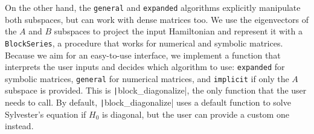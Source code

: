 On the other hand, the \texttt{general} and \texttt{expanded} algorithms explicitly
manipulate both subspaces, but can work with dense matrices too.
We use the eigenvectors of the $A$ and $B$ subspaces to project the input
Hamiltonian and represent it with a \texttt{BlockSeries}, a procedure that works for
numerical and symbolic matrices.
Because we aim for an easy-to-use interface, we implement a function that
interprets the user inputs and decides which algorithm to use: \texttt{expanded}
for symbolic matrices, \texttt{general} for numerical matrices, and \texttt{implicit} if
only the $A$ subspace is provided.
This is \texttt|block\_diagonalize|, the only function that the user needs to call.
By default, \texttt|block\_diagonalize| uses a default function to solve Sylvester's
equation if $H_0$ is diagonal, but the user can provide a custom one instead.
